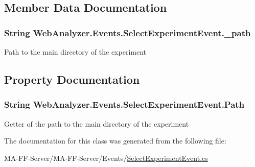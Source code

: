 \subsection{Member Data Documentation}
\hypertarget{class_web_analyzer_1_1_events_1_1_select_experiment_event_a8bf3d855a5562c63c3d4f1a028f05b20}{}
\subsubsection[{\+\_\+path}]{\setlength{\rightskip}{0pt plus 5cm}String Web\+Analyzer.\+Events.\+Select\+Experiment\+Event.\+\_\+path\hspace{0.3cm}{\ttfamily [private]}}\label{class_web_analyzer_1_1_events_1_1_select_experiment_event_a8bf3d855a5562c63c3d4f1a028f05b20}


Path to the main directory of the experiment 



\subsection{Property Documentation}
\hypertarget{class_web_analyzer_1_1_events_1_1_select_experiment_event_a7c9d614ac51f5dadaba4f5dd5e38c9d3}{}
\subsubsection[{Path}]{\setlength{\rightskip}{0pt plus 5cm}String Web\+Analyzer.\+Events.\+Select\+Experiment\+Event.\+Path\hspace{0.3cm}{\ttfamily [get]}}\label{class_web_analyzer_1_1_events_1_1_select_experiment_event_a7c9d614ac51f5dadaba4f5dd5e38c9d3}


Getter of the path to the main directory of the experiment 



The documentation for this class was generated from the following file\+:\begin{DoxyCompactItemize}
\item 
M\+A-\/\+F\+F-\/\+Server/\+M\+A-\/\+F\+F-\/\+Server/\+Events/\hyperlink{_select_experiment_event_8cs}{Select\+Experiment\+Event.\+cs}\end{DoxyCompactItemize}
